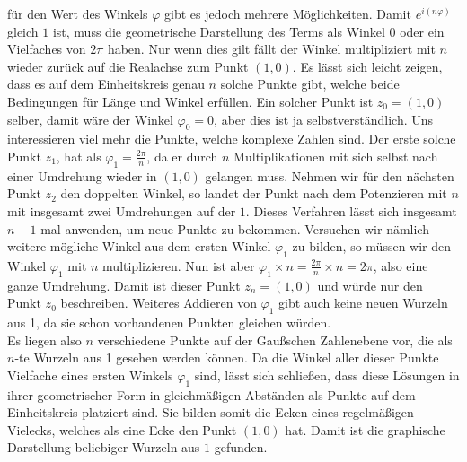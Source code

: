 \documentclass[a4paper,12pt]{article} %
\begin{document}
für den Wert des Winkels $\varphi$ gibt es jedoch mehrere Möglichkeiten.
Damit $e^{i(n\varphi)}$ gleich $1$ ist, muss die geometrische Darstellung des Terms als Winkel $0$ oder ein Vielfaches von $2\pi$ haben.
Nur wenn dies gilt fällt der Winkel multipliziert mit $n$ wieder zurück auf die Realachse zum Punkt $(1,0)$.
Es lässt sich leicht zeigen, dass es auf dem Einheitskreis genau $n$ solche Punkte gibt, welche beide Bedingungen für Länge und Winkel erfüllen.
Ein solcher Punkt ist $z_0=(1,0)$ selber, damit wäre der Winkel $\varphi_0=0$, aber dies ist ja selbstverständlich.
Uns interessieren viel mehr die Punkte, welche komplexe Zahlen sind.
Der erste solche Punkt $z_1$, hat als $\varphi_1=\frac{2\pi}{n}$, da er durch $n$ Multiplikationen mit sich selbst nach einer Umdrehung wieder in $(1, 0)$ gelangen muss.
Nehmen wir für den nächsten Punkt $z_2$ den doppelten Winkel, so landet der Punkt nach dem Potenzieren mit $n$ mit insgesamt zwei Umdrehungen auf der $1$.
Dieses Verfahren lässt sich insgesamt $n-1$ mal anwenden, um neue Punkte zu bekommen.
Versuchen wir nämlich weitere mögliche Winkel aus dem ersten Winkel $\varphi_1$ zu bilden, so müssen wir den Winkel $\varphi_1$ mit $n$ multiplizieren.
Nun ist aber $\varphi_1 \times n =\frac{2\pi}{n}\times n = 2\pi$, also eine ganze Umdrehung.
Damit ist dieser Punkt $z_n=(1,0)$ und würde nur den Punkt $z_0$ beschreiben.
Weiteres Addieren von $\varphi_1$ gibt auch keine neuen Wurzeln aus 1, da sie schon vorhandenen Punkten gleichen würden.\\


Es liegen also $n$ verschiedene Punkte auf der Gaußschen Zahlenebene vor, die als $n$-te Wurzeln aus 1 gesehen werden können.
Da die Winkel aller dieser Punkte Vielfache eines ersten Winkels $\varphi_1$ sind, lässt sich schließen, dass diese Lösungen in ihrer geometrischer Form in gleichmäßigen Abständen als Punkte auf dem Einheitskreis platziert sind.
Sie bilden somit die Ecken eines regelmäßigen Vielecks, welches als eine Ecke den Punkt $(1,0)$ hat.
Damit ist die graphische Darstellung beliebiger Wurzeln aus $1$ gefunden.
\end{document}
